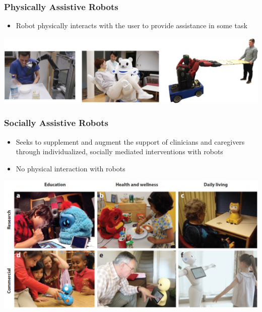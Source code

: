 \documentclass[10pt]{article}
\begin{document}
\subsubsection*{Physically Assistive Robots}
\begin{itemize}
	\item Robot physically interacts with the user to provide assistance in some task
\end{itemize}
\begin{center} 
    \includegraphics*[width=\textwidth]{L1_13.png} 
\end{center}

\subsubsection*{Socially Assistive Robots}
\begin{itemize}
	\item Seeks to supplement and augment the support of clinicians and caregivers through individualized, socially mediated interventions with robots
    \item No physical interaction with robots
\end{itemize}
\begin{center} 
    \includegraphics*[width=\textwidth]{L1_14.png} 
\end{center}
\end{document}
